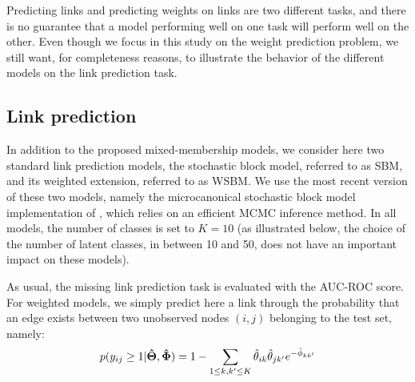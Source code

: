 Predicting links and predicting weights on links are two different tasks, and there is no guarantee that a model performing well on one task will perform well on the other. Even though we focus in this study on the weight prediction problem, we still want, for completeness reasons, to illustrate the behavior of the different models on the link prediction task.

\subsection{Link prediction}

\begin{table*}[t]
\centering
	
\label{table:roc}
\end{table*}

In addition to the proposed mixed-membership models, we consider here two standard link prediction models, the stochastic block model, referred to as SBM, and its weighted extension, referred to as WSBM. We use the most recent version of these two models, namely the microcanonical stochastic block model implementation of \cite{peixoto2018nonparametric}, which relies on an efficient MCMC inference method. In all models, the number of classes is set to $K=10$ (as illustrated below, the choice of the number of latent classes, in between 10 and 50, does not have an important impact on these models).

As usual, the missing link prediction task is evaluated with the AUC-ROC score. For weighted models, we simply predict here a link through the probability that an edge exists between two unobserved nodes $(i,j)$ belonging to the test set, namely:
\[
p(y_{ij} \geq 1 | \boldsymbol{\hat\Theta}, \boldsymbol{\hat\Phi}) = 1 - \sum_{1 \le k,k' \le K} \hat\theta_{ik} \hat\theta_{jk'} e^{-\hat\phi_{kk'}}
\]


